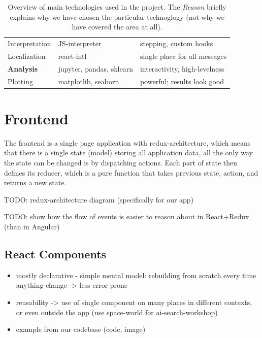 \begin{table}[h]
\begin{center}
\begin{tabular}{l l l}
Interpretation & JS-interpreter & stepping, custom hooks \\
Localization & react-intl & single place for all messages \\
\hline
\textbf{Analysis} & jupyter, pandas, sklearn & interactivity, high-levelness \\
Plotting & matplotlib, seaborn & powerful; results look good \\
\bottomrule
\end{tabular}
\end{center}
\caption{%
  Overview of main technologies used in the project. %
  The \emph{Reason} briefly explains why we have chosen the particular technoglogy
  (not why we have covered the area at all).}
\label{tbl:technologies}
\end{table}

\section{Frontend}

The frontend is a single page application with redux-architecture,
which means that there is a single state (model) storing all application data,
all the only way the state can be changed is by dispatching actions.
Each part of state then defines its reducer,
which is a pure function that takes previous state, action, and returns a new state.

TODO: redux-architecture diagram (specifically for our app)

TODO: show how the flow of events is easier to reason about in React+Redux (than in Angular)

\subsection{React Components}

\begin{itemize}
\item mostly declarative - simple mental model: rebuilding from scratch every time anything change -> less error prone
\item reusability -> use of single component on many places in different contexts,
  or even outside the app (use space-world for ai-search-workshop)
\item example from our codebase (code, image)
\end{itemize}

